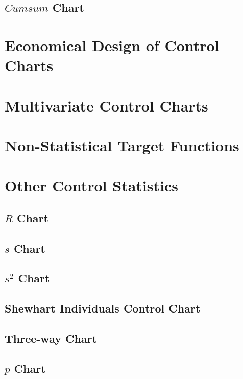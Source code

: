 \subsection{$Cumsum$ Chart}




\section{Economical Design of Control Charts}
\label{sec:economical_considerations}





\section{Multivariate Control Charts}
\label{sec:multivariate}





\section{Non-Statistical Target Functions}






\section{Other Control Statistics}
\subsection{$R$ Chart}
\subsection{$s$ Chart}
\subsection{$s^2$ Chart}
\subsection{Shewhart Individuals Control Chart}
\subsection{Three-way Chart}
\subsection{$p$ Chart}
